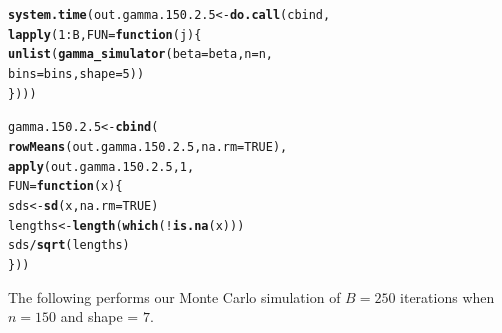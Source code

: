 \documentclass[11pt]{article}\usepackage[]{graphicx}\usepackage[]{color}
\makeatletter
\newcommand{\hlnum}[1]{\textcolor[rgb]{0.686,0.059,0.569}{#1}}%
\newcommand{\hlopt}[1]{\textcolor[rgb]{0,0,0}{#1}}%
\newcommand{\hlstd}[1]{\textcolor[rgb]{0.345,0.345,0.345}{#1}}%
\newcommand{\hlkwa}[1]{\textcolor[rgb]{0.161,0.373,0.58}{\textbf{#1}}}%
\newcommand{\hlkwb}[1]{\textcolor[rgb]{0.69,0.353,0.396}{#1}}%
\newcommand{\hlkwc}[1]{\textcolor[rgb]{0.333,0.667,0.333}{#1}}%
\newcommand{\hlkwd}[1]{\textcolor[rgb]{0.737,0.353,0.396}{\textbf{#1}}}%
\newenvironment{kframe}{%
 \def\at@end@of@kframe{}%
 \ifinner\ifhmode%
  \def\at@end@of@kframe{\end{minipage}}%
  \begin{minipage}{\columnwidth}%
 \fi\fi%
 \def\FrameCommand##1{\hskip\@totalleftmargin \hskip-\fboxsep
 \colorbox{shadecolor}{##1}\hskip-\fboxsep
     \hskip-\linewidth \hskip-\@totalleftmargin \hskip\columnwidth}%
 \MakeFramed {\advance\hsize-\width
   \@totalleftmargin\z@ \linewidth\hsize
   \@setminipage}}%
 {\par\unskip\endMakeFramed%
 \at@end@of@kframe}
\newenvironment{knitrout}{}{} %
\makeatother
\begin{document}
\begin{knitrout}
\color{fgcolor}\begin{kframe}
\begin{alltt}
\hlkwd{system.time}\hlstd{(out.gamma.150.2.5} \hlkwb{<-} \hlkwd{do.call}\hlstd{(cbind,}
  \hlkwd{lapply}\hlstd{(}\hlnum{1}\hlopt{:}\hlstd{B,} \hlkwc{FUN} \hlstd{=} \hlkwa{function}\hlstd{(}\hlkwc{j}\hlstd{)\{}
    \hlkwd{unlist}\hlstd{(}\hlkwd{gamma_simulator}\hlstd{(}\hlkwc{beta} \hlstd{= beta,} \hlkwc{n} \hlstd{= n,}
      \hlkwc{bins} \hlstd{= bins,} \hlkwc{shape} \hlstd{=} \hlnum{5}\hlstd{))}
\hlstd{\})))}
\end{alltt}


{\ttfamily\noindent\bfseries\color{errorcolor}{\#\# Error in eval(family\$initialize): non-positive values not allowed for the 'gamma' family}}

{\ttfamily\noindent\itshape\color{messagecolor}{\#\# Timing stopped at: 0.003 0 0.003}}\end{kframe}
\end{knitrout}

\begin{knitrout}
\color{fgcolor}\begin{kframe}
\begin{alltt}
\hlstd{gamma.150.2.5} \hlkwb{<-} \hlkwd{cbind}\hlstd{(}
  \hlkwd{rowMeans}\hlstd{(out.gamma.150.2.5,} \hlkwc{na.rm} \hlstd{=} \hlnum{TRUE}\hlstd{),}
  \hlkwd{apply}\hlstd{(out.gamma.150.2.5,} \hlnum{1}\hlstd{,}
  \hlkwc{FUN} \hlstd{=} \hlkwa{function}\hlstd{(}\hlkwc{x}\hlstd{)\{}
    \hlstd{sds} \hlkwb{<-} \hlkwd{sd}\hlstd{(x,} \hlkwc{na.rm} \hlstd{=} \hlnum{TRUE}\hlstd{)}
    \hlstd{lengths} \hlkwb{<-} \hlkwd{length}\hlstd{(}\hlkwd{which}\hlstd{(}\hlopt{!}\hlkwd{is.na}\hlstd{(x)))}
    \hlstd{sds} \hlopt{/} \hlkwd{sqrt}\hlstd{(lengths)}
  \hlstd{\}))}
\end{alltt}


{\ttfamily\noindent\bfseries\color{errorcolor}{\#\# Error in is.data.frame(x): object 'out.gamma.150.2.5' not found}}\end{kframe}
\end{knitrout}

The following performs our Monte Carlo simulation of $B = 250$ iterations 
when $n = 150$ and shape = $7$.
\end{document}
